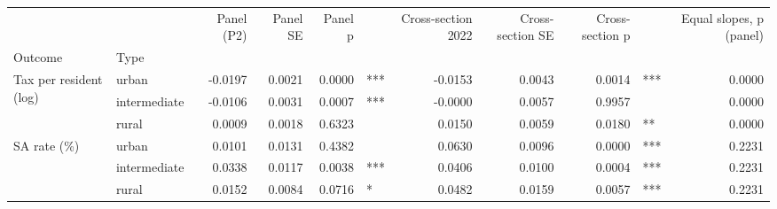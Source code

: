 \begin{tabular}{llrrrlrrrlr}
\toprule
 &  & Panel (P2) & Panel SE & Panel p &  & Cross-section 2022 & Cross-section SE & Cross-section p &   & Equal slopes, p (panel) \\
Outcome & Type &  &  &  &  &  &  &  &  &  \\
\midrule
\multirow[t]{3}{*}{Tax per resident (log)} & urban & -0.0197 & 0.0021 & 0.0000 & *** & -0.0153 & 0.0043 & 0.0014 & *** & 0.0000 \\
 & intermediate & -0.0106 & 0.0031 & 0.0007 & *** & -0.0000 & 0.0057 & 0.9957 &  & 0.0000 \\
 & rural & 0.0009 & 0.0018 & 0.6323 &  & 0.0150 & 0.0059 & 0.0180 & ** & 0.0000 \\
\cline{1-11}
\multirow[t]{3}{*}{SA rate (\%)} & urban & 0.0101 & 0.0131 & 0.4382 &  & 0.0630 & 0.0096 & 0.0000 & *** & 0.2231 \\
 & intermediate & 0.0338 & 0.0117 & 0.0038 & *** & 0.0406 & 0.0100 & 0.0004 & *** & 0.2231 \\
 & rural & 0.0152 & 0.0084 & 0.0716 & * & 0.0482 & 0.0159 & 0.0057 & *** & 0.2231 \\
\cline{1-11}
\bottomrule
\end{tabular}
